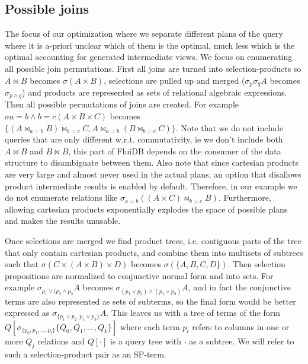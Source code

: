\subsection{Possible joins}
\label{sec:possible_joins}

The focus of our optimization where we separate different plans of the
query where it is a-priori unclear which of them is the optimal, much
less which is the optimal accounting for generated intermediate
views. We focus on enumerating all possible join permutations. First
all joins are turned into selection-products so \(A \Join B\) becomes
\(\sigma(A \times B)\), selections are pulled up and merged
(\(\sigma_p \sigma_q A\) becomes \(\sigma_{p \land q}\)) and products
are represented as sets of relational algebraic expressions. Then all
possible permutations of joins are created. For example
\(\sigma{a=b \land b=c}(A \times B \times C)\) becomes
\(\{(A \Join_{a=b} B) \Join_{b=c} C, A \Join_{a=b} (B \Join_{b=c}
C)\}\). Note that we do not include queries that are only different
w.r.t. commutativity, ie we don't include both \(A \Join B\) and
\(B \Join B\), this part of FluiDB depends on the consumer of the data
structure to disambiguate between them. Also note that since cartesian
products are very large and almost never used in the actual plans, an
option that disallows product intermediate results is enabled by
default. Therefore, in our example we do not enumerate relations like
\(\sigma_{a=b}((A \times C) \Join_{b=c}B)\). Furthermore, allowing
cartesian products exponentially explodes the space of possible plans
and makes the results unusable.

Once selections are merged we find product trees, i.e. contiguous parts
of the tree that only contain cartesian products, and combine them
into multisets of subtrees such that \(\sigma(C \times (A \times B)
\times D)\) becomes \(\sigma(\{A,B,C,D\})\). Then selection propositions
are normalized to conjunctive normal form and into sets. For example
\(\sigma_{p_1 \lor (p_2 \land p_3}A\) becomes \(\sigma_{(p_1 \lor p_2)
  \land (p_1 \lor p_3)}A\), and in fact the conjunctive terms are also
represented as sets of subterms, so the final form would be better
expressed as \(\sigma_{\{p_1 \lor p_2,p_1 \lor p_3\}}A\). This leaves us
with a tree of terms of the form
\(Q[\sigma_{\{p_0,p_1,...,p_l\}}\{Q_0,Q_1,...,Q_k\}]\) where each term
\(p_i\) refers to columns in one or more \(Q_j\) relations and
\(Q[\cdot]\) is a query tree with \(\cdot\) as a subtree. We will
refer to such a selection-product pair as an SP-term.

